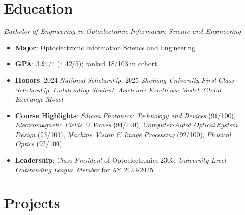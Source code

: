 \documentclass{resume}
\begin{document}
\small



\section{Education}

\textit{Bachelor of Engineering in Optoelectronic Information Science and Engineering}
\begin{itemize} [parsep=0.5ex]
  \item \textbf{Major}: Optoelectronic Information Science and Engineering
  \item \textbf{GPA}: 3.94/4 (4.42/5); ranked 18/103 in cohort
  \item \textbf{Honors}: 2024 \textit{National Scholarship}; 2025 \textit{Zhejiang University First-Class Scholarship}; \textit{Outstanding Student}; \textit{Academic Excellence Model}; \textit{Global Exchange Model}
  \item \textbf{Course Highlights}: \textit{Silicon Photonics: Technology and Devices} (96/100), \textit{Electromagnetic Fields \& Waves} (94/100), \textit{Computer-Aided Optical System Design} (93/100), \textit{Machine Vision \& Image Processing} (92/100), \textit{Physical Optics} (92/100)
  \item \textbf{Leadership}: \textit{Class President} of Optoelectronics 2303; \textit{University-Level Outstanding League Member} for AY 2024-2025
\end{itemize}

\section{Projects}
\end{document}

